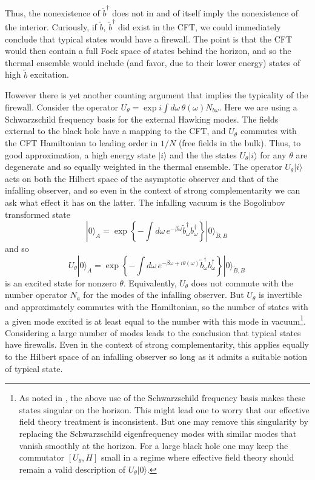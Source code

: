 \documentclass[12pt]{article}
\newcommand{\be}{\begin{equation}}
\newcommand{\ee}{\end{equation}}
\begin{document}
{Thus, the nonexistence of $\tilde b^\dagger$ does not in and of itself imply the nonexistence of the interior.  Curiously, if
 $\tilde b$, $\tilde b^\dagger$ did exist in the CFT, we could immediately conclude that typical states would have a firewall.  The point is that the CFT would then contain a full Fock space of states behind the horizon, and so the thermal ensemble would include (and favor, due to their {lower} energy) states of high $\tilde b$ excitation.

However there is yet another counting argument that implies the typicality of the firewall.  Consider the operator $U_\theta = \exp i\int d\omega\,\theta(\omega) N_{b \omega}$.  Here we are using a Schwarzschild frequency basis for the external Hawking modes.  The fields external to the black hole have a mapping to the CFT, and $U_\theta$ commutes with the CFT Hamiltonian to leading order in $1/N$ (free fields in the bulk).  Thus, to good approximation, a high energy state $|i\rangle$ and the the states $U_\theta |i\rangle$ for any $\theta$ are degenerate and so equally weighted in the thermal ensemble.  The operator $U_\theta |i\rangle$ acts  on both the Hilbert space of the asymptotic observer and that of the infalling observer, and so even in the context of strong complementarity we can ask what effect it has on the latter.  The infalling vacuum
is the Bogoliubov transformed state
\be
|0\rangle_A = \exp \left\{ -\int d\omega \, e^{-\beta\omega} \tilde b_\omega^\dagger b^\dagger_\omega \right\}|0\rangle_{\tilde{B},B} \,
\ee
and so
\be
U_\theta |0\rangle_A = \exp \left\{ -\int d\omega \, e^{-\beta\omega + i \theta(\omega)} \tilde b_\omega^\dagger b^\dagger_\omega \right\}|0\rangle_{\tilde{B},B} \,
\ee
is an excited state for nonzero $\theta$.  Equivalently, $U_\theta$ does not commute with the number operator $N_a$ for the
modes of the infalling observer. But $U_\theta$ is invertible and approximately commutes with the Hamiltonian, so the number of states with a given mode excited is at least equal to the number with this mode in vacuum\footnote{{As noted in \cite{Maldacena:2013xja}, the above use of the Schwarzschild frequency basis makes these states singular on the horizon.  This might lead one to worry that our effective field theory treatment is inconsistent.   But one may remove this singularity by replacing the Schwarzschild eigenfrequency modes with similar modes that vanish smoothly at the horizon.  For a large black hole one may keep the commutator $[U_\theta, H]$ small in a regime where effective field theory should remain a valid description of $U_\theta |0\rangle$. }}.  Considering a large number of modes leads to the conclusion that typical states have firewalls.  Even in the context of strong complementarity, this  applies equally to the Hilbert space of an infalling observer  so long as it admits a suitable notion of typical state.


}
\end{document}
